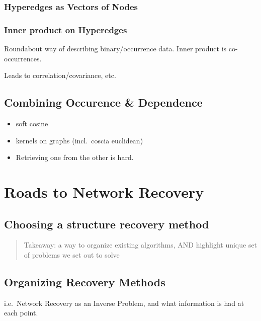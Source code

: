 \documentclass[%
	12pt,
		oneside,
		letterpaper
]{book}
\providecommand{\tightlist}{%
  \setlength{\itemsep}{0pt}\setlength{\parskip}{0pt}}\usepackage{longtable,booktabs,array}
\begin{document}
\subsection{Hyperedges as Vectors of
Nodes}\label{hyperedges-as-vectors-of-nodes}

\subsection{Inner product on
Hyperedges}\label{inner-product-on-hyperedges}

Roundabout way of describing binary/occurrence data. Inner product is
co-occurrences.

Leads to correlation/covariance, etc.

\section{Combining Occurence \&
Dependence}\label{combining-occurence-dependence}

\begin{itemize}
\tightlist
\item
  soft cosine
\item
  kernels on graphs (incl.~coscia euclidean)
\item
  Retrieving one from the other is hard.
\end{itemize}

\chapter{Roads to Network Recovery}\label{roads-to-network-recovery}

\section{Choosing a structure recovery
method}\label{choosing-a-structure-recovery-method}

\begin{quote}
Takeaway: a way to organize existing algorithms, AND highlight unique
set of problems we set out to solve
\end{quote}

\section{Organizing Recovery Methods}\label{organizing-recovery-methods}

i.e.~Network Recovery as an Inverse Problem, and what information is had
at each point.
\end{document}
